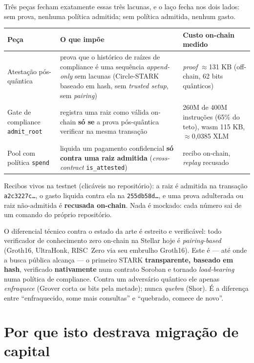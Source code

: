 \documentclass[11pt]{article}
\newcommand{\code}[1]{\texttt{\small #1}}
\begin{document}
Três peças fecham exatamente essas três lacunas, e o laço fecha nos dois lados:
sem prova, nenhuma política admitida; sem política admitida, nenhum gasto.

\begin{center}
\small
\begin{tabular}{@{}p{3.1cm}p{6.2cm}p{4.4cm}@{}}
\toprule
\textbf{Peça} & \textbf{O que impõe} & \textbf{Custo on-chain medido} \\
\midrule
Atestação pós-quântica & prova que o histórico de raízes de compliance é uma
sequência \emph{append-only} sem lacunas (Circle-STARK baseado em hash, sem
\emph{trusted setup}, sem \emph{pairing}) & \emph{proof} $\approx$131 KB
(off-chain, 62 bits quânticos) \\
\addlinespace
Gate de compliance \code{admit\_root} & registra uma raiz como válida on-chain
\textbf{só se} a prova pós-quântica verificar na mesma transação & 260M de 400M
instruções (65\% do teto), wasm 115 KB, $\approx$0,0385 XLM \\
\addlinespace
Pool com política \code{spend} & liquida um pagamento confidencial \textbf{só
contra uma raiz admitida} (\emph{cross-contract} \code{is\_attested}) & recibo
on-chain, \emph{replay} recusado \\
\bottomrule
\end{tabular}
\end{center}

Recibos vivos na testnet (clicáveis no repositório): a raiz é admitida na
transação \code{a2c3227c\ldots}, o gasto liquida contra ela na
\code{255db58d\ldots}, e uma prova adulterada ou raiz não-admitida é
\textbf{recusada on-chain}. Nada é mockado: cada número sai de um comando do
próprio repositório.

O diferencial técnico contra o estado da arte é estreito e verificável: todo
verificador de conhecimento zero on-chain na Stellar hoje é \emph{pairing-based}
(Groth16, UltraHonk, RISC~Zero via seu embrulho Groth16). Este é --- até onde a
busca pública alcança --- o primeiro STARK \textbf{transparente, baseado em hash},
verificado \textbf{nativamente} num contrato Soroban e tornado \emph{load-bearing}
numa política de compliance. Contra um adversário quântico ele apenas
\emph{enfraquece} (Grover corta os bits pela metade); nunca \emph{quebra} (Shor).
É a diferença entre ``enfraquecido, some mais consultas'' e ``quebrado, comece de
novo''.

\section{Por que isto destrava migração de capital}
\end{document}
